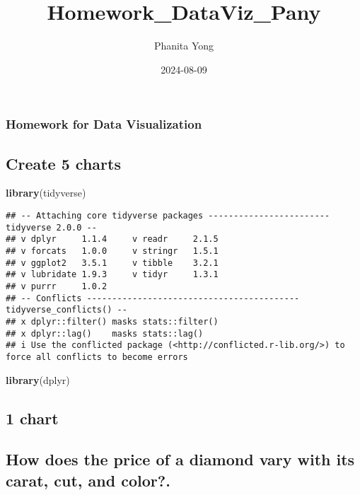 \documentclass[
]{article}
\title{Homework\_DataViz\_Pany}
\author{Phanita Yong}
\date{2024-08-09}
\newenvironment{Shaded}{\begin{snugshade}}{\end{snugshade}}
\newcommand{\FunctionTok}[1]{\textcolor[rgb]{0.13,0.29,0.53}{\textbf{#1}}}
\newcommand{\NormalTok}[1]{#1}
\begin{document}
\maketitle

\subsubsection{Homework for Data
Visualization}\label{homework-for-data-visualization}

\subsection{Create 5 charts}\label{create-5-charts}

\begin{Shaded}
\begin{Highlighting}[]
\FunctionTok{library}\NormalTok{(tidyverse)}
\end{Highlighting}
\end{Shaded}

\begin{verbatim}
## -- Attaching core tidyverse packages ------------------------ tidyverse 2.0.0 --
## v dplyr     1.1.4     v readr     2.1.5
## v forcats   1.0.0     v stringr   1.5.1
## v ggplot2   3.5.1     v tibble    3.2.1
## v lubridate 1.9.3     v tidyr     1.3.1
## v purrr     1.0.2     
## -- Conflicts ------------------------------------------ tidyverse_conflicts() --
## x dplyr::filter() masks stats::filter()
## x dplyr::lag()    masks stats::lag()
## i Use the conflicted package (<http://conflicted.r-lib.org/>) to force all conflicts to become errors
\end{verbatim}

\begin{Shaded}
\begin{Highlighting}[]
\FunctionTok{library}\NormalTok{(dplyr)}
\end{Highlighting}
\end{Shaded}

\subsection{1 chart}\label{chart}

\subsection{How does the price of a diamond vary with its carat, cut,
and
color?.}\label{how-does-the-price-of-a-diamond-vary-with-its-carat-cut-and-color.}
\end{document}
